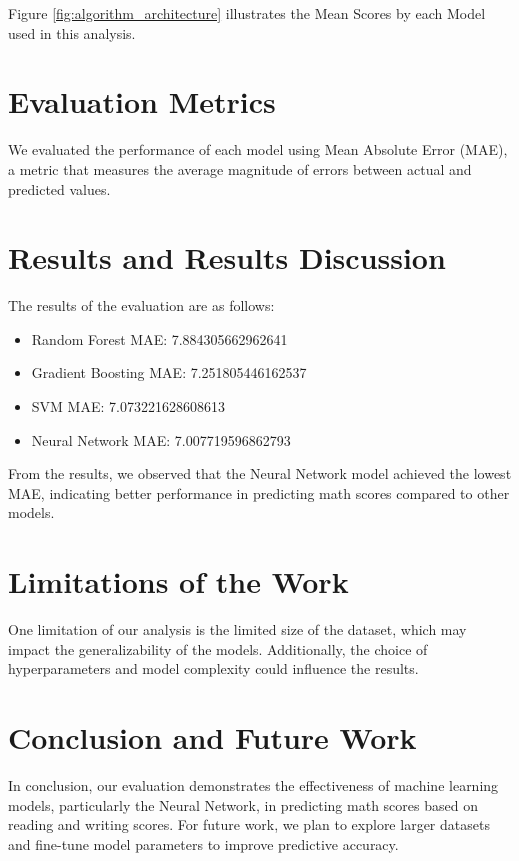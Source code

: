 \documentclass{article}
\begin{document}
Figure \ref{fig:algorithm_architecture} illustrates  the  Mean Scores by each Model used in this analysis.

\section{Evaluation Metrics}
We evaluated the performance of each model using Mean Absolute Error (MAE), a metric that measures the average magnitude of errors between actual and predicted values.

\section{Results and Results Discussion}
The results of the evaluation are as follows:
\begin{itemize}
\item Random Forest MAE: 7.884305662962641
\item Gradient Boosting MAE: 7.251805446162537
\item SVM MAE: 7.073221628608613
\item Neural Network MAE: 7.007719596862793
\end{itemize}

From the results, we observed that the Neural Network model achieved the lowest MAE, indicating better performance in predicting math scores compared to other models.

\section{Limitations of the Work}
One limitation of our analysis is the limited size of the dataset, which may impact the generalizability of the models. Additionally, the choice of hyperparameters and model complexity could influence the results.

\section{Conclusion and Future Work}
In conclusion, our evaluation demonstrates the effectiveness of machine learning models, particularly the Neural Network, in predicting math scores based on reading and writing scores. For future work, we plan to explore larger datasets and fine-tune model parameters to improve predictive accuracy.
\end{document}
